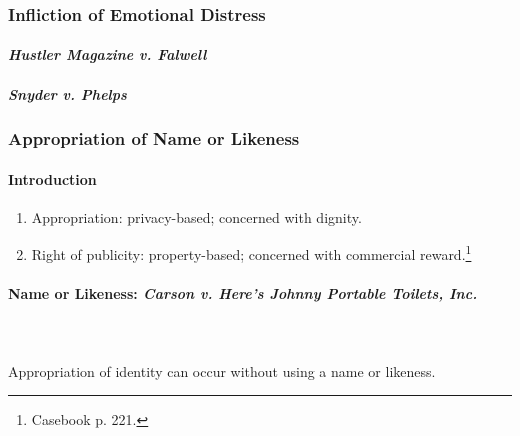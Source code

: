 
\newpage %

\subsubsection{Infliction of Emotional Distress}

\paragraph{\emph{Hustler Magazine v. Falwell}}


\paragraph{\emph{Snyder v. Phelps}}


\subsubsection{Appropriation of Name or Likeness}

\paragraph{Introduction}

\begin{enumerate}
    \item Appropriation: privacy-based; concerned with dignity.
    \item Right of publicity: property-based; concerned with commercial 
    reward.\footnote{Casebook p. 221.}
\end{enumerate}

\paragraph{Name or Likeness: \emph{Carson v. Here's Johnny Portable Toilets, 
Inc.}}
~\\\\
Appropriation of identity can occur without using a name or likeness.

